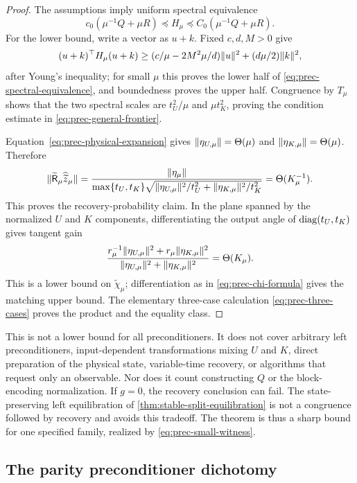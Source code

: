 \begin{proof}
The assumptions imply uniform spectral equivalence
\begin{equation}
 c_0(\mu^{-1}Q+\mu R)\preceq H_\mu
 \preceq C_0(\mu^{-1}Q+\mu R).                           \label{eq:prec-spectral-equivalence}
\end{equation}
For the lower bound, write a vector as $u+k$.  Fixed $c,d,M>0$ give
\[
 (u+k)^\top H_\mu(u+k)
 \geq(c/\mu-2M^2\mu/d)\lVert u\rVert^2+(d\mu/2)\lVert k\rVert^2,
\]
after Young's inequality; for small $\mu$ this proves the lower half of
\eqref{eq:prec-spectral-equivalence}, and boundedness proves the upper half.
Congruence by $T_\mu$ shows that the two spectral scales are
$t_U^2/\mu$ and $\mu t_K^2$, proving the condition estimate in
\eqref{eq:prec-general-frontier}.

Equation~\eqref{eq:prec-physical-expansion} gives
$\lVert\eta_{U,\mu}\rVert=\Theta(\mu)$ and
$\lVert\eta_{K,\mu}\rVert=\Theta(\mu)$.  Therefore
\[
 \lVert\widetilde{\mathsf R}_\mu\widehat{\widetilde z}_\mu\rVert
 =\frac{\lVert\eta_\mu\rVert}
 {\max\{t_U,t_K\}
  \sqrt{\lVert\eta_{U,\mu}\rVert^2/t_U^2+
        \lVert\eta_{K,\mu}\rVert^2/t_K^2}}
 =\Theta(K_\mu^{-1}).
\]
This proves the recovery-probability claim.  In the plane spanned by the
normalized $U$ and $K$ components, differentiating the output angle of
$\operatorname{diag}(t_U,t_K)$ gives tangent gain
\[
 \frac{r_\mu^{-1}\lVert\eta_{U,\mu}\rVert^2+
       r_\mu\lVert\eta_{K,\mu}\rVert^2}
      {\lVert\eta_{U,\mu}\rVert^2+\lVert\eta_{K,\mu}\rVert^2}
 =\Theta(K_\mu).
\]
This is a lower bound on $\widetilde\chi_\mu$; differentiation as in
\eqref{eq:prec-chi-formula} gives the matching upper bound.  The elementary
three-case calculation \eqref{eq:prec-three-cases} proves the product and
the equality class.
\end{proof}

This is not a lower bound for all preconditioners.  It does not cover
arbitrary left preconditioners, input-dependent transformations mixing $U$
and $K$, direct preparation of the physical state, variable-time recovery, or
algorithms that request only an observable.  Nor does it count constructing
$Q$ or the block-encoding normalization.  If $g=0$, the recovery conclusion
can fail.  The state-preserving left equilibration of
\cref{thm:stable-split-equilibration} is not a congruence followed by
recovery and avoids this tradeoff.  The theorem is thus a sharp bound for one
specified family, realized by \eqref{eq:prec-small-witness}.

\subsection{The parity preconditioner dichotomy}
\label{sec:preconditioning-parity}

